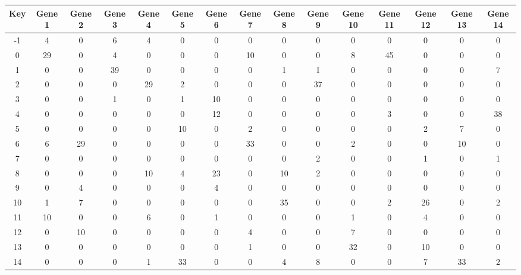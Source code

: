 \begin{tabular}{|c|c|c|c|c|c|c|c|c|c|c|c|c|c|c|}
\hline
Key & Gene 1 & Gene 2 & Gene 3 & Gene 4 & Gene 5 & Gene 6 & Gene 7 & Gene 8 & Gene 9 & Gene 10 & Gene 11 & Gene 12 & Gene 13 & Gene 14 \\
\hline
-1 & 4 & 0 & 6 & 4 & 0 & 0 & 0 & 0 & 0 & 0 & 0 & 0 & 0 & 0 \\
0 & 29 & 0 & 4 & 0 & 0 & 0 & 10 & 0 & 0 & 8 & 45 & 0 & 0 & 0 \\
1 & 0 & 0 & 39 & 0 & 0 & 0 & 0 & 1 & 1 & 0 & 0 & 0 & 0 & 7 \\
2 & 0 & 0 & 0 & 29 & 2 & 0 & 0 & 0 & 37 & 0 & 0 & 0 & 0 & 0 \\
3 & 0 & 0 & 1 & 0 & 1 & 10 & 0 & 0 & 0 & 0 & 0 & 0 & 0 & 0 \\
4 & 0 & 0 & 0 & 0 & 0 & 12 & 0 & 0 & 0 & 0 & 3 & 0 & 0 & 38 \\
5 & 0 & 0 & 0 & 0 & 10 & 0 & 2 & 0 & 0 & 0 & 0 & 2 & 7 & 0 \\
6 & 6 & 29 & 0 & 0 & 0 & 0 & 33 & 0 & 0 & 2 & 0 & 0 & 10 & 0 \\
7 & 0 & 0 & 0 & 0 & 0 & 0 & 0 & 0 & 2 & 0 & 0 & 1 & 0 & 1 \\
8 & 0 & 0 & 0 & 10 & 4 & 23 & 0 & 10 & 2 & 0 & 0 & 0 & 0 & 0 \\
9 & 0 & 4 & 0 & 0 & 0 & 4 & 0 & 0 & 0 & 0 & 0 & 0 & 0 & 0 \\
10 & 1 & 7 & 0 & 0 & 0 & 0 & 0 & 35 & 0 & 0 & 2 & 26 & 0 & 2 \\
11 & 10 & 0 & 0 & 6 & 0 & 1 & 0 & 0 & 0 & 1 & 0 & 4 & 0 & 0 \\
12 & 0 & 10 & 0 & 0 & 0 & 0 & 4 & 0 & 0 & 7 & 0 & 0 & 0 & 0 \\
13 & 0 & 0 & 0 & 0 & 0 & 0 & 1 & 0 & 0 & 32 & 0 & 10 & 0 & 0 \\
14 & 0 & 0 & 0 & 1 & 33 & 0 & 0 & 4 & 8 & 0 & 0 & 7 & 33 & 2 \\
\hline
\end{tabular}